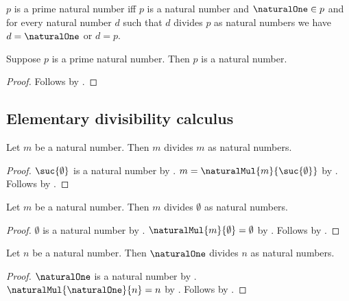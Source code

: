 \begin{definition}\label{prime_natural}
    $p$ is a prime natural number iff
        $p$ is a natural number and $\naturalOne\in p$ and
        for every natural number $d$ such that
            $d$ divides $p$ as natural numbers we have
            $d=\naturalOne$ or $d=p$.
\end{definition}

\begin{proposition}\label{prime_natural_guard}
    Suppose $p$ is a prime natural number.
    Then $p$ is a natural number.
\end{proposition}
\begin{proof}
    Follows by .
\end{proof}

\subsection{Elementary divisibility calculus}

\begin{proposition}\label{natural_divides_itself}
    Let $m$ be a natural number.
    Then $m$ divides $m$ as natural numbers.
\end{proposition}
\begin{proof}
    $\suc{\emptyset}$ is a natural number
        by .
    $m=\naturalMul{m}{\suc{\emptyset}}$
        by .
    Follows by .
\end{proof}

\begin{proposition}\label{every_natural_divides_zero}
    Let $m$ be a natural number.
    Then $m$ divides $\emptyset$ as natural numbers.
\end{proposition}
\begin{proof}
    $\emptyset$ is a natural number by .
    $\naturalMul{m}{\emptyset}=\emptyset$
        by .
    Follows by .
\end{proof}

\begin{proposition}\label{one_divides_every_natural}
    Let $n$ be a natural number.
    Then $\naturalOne$ divides $n$ as natural numbers.
\end{proposition}
\begin{proof}
    $\naturalOne$ is a natural number
        by .
    $\naturalMul{\naturalOne}{n}=n$
        by .
    Follows by .
\end{proof}

